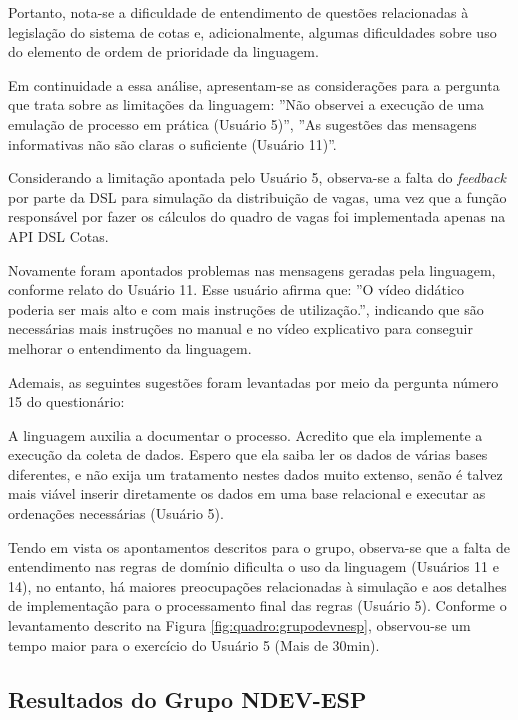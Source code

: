 Portanto, nota-se a dificuldade de entendimento de questões relacionadas à legislação do sistema de cotas e, adicionalmente, algumas dificuldades sobre uso do elemento de ordem de prioridade da linguagem. 

Em continuidade a essa análise, apresentam-se as considerações para a pergunta que trata sobre as limitações da linguagem: ''Não observei a execução de uma emulação de processo em prática (Usuário 5)'', ''As sugestões das mensagens informativas não são claras o suficiente (Usuário 11)''.

Considerando a limitação apontada pelo Usuário 5, observa-se a falta do \textit{feedback} por parte da DSL para simulação da distribuição de vagas, uma vez que a função responsável por fazer os cálculos do quadro de vagas foi implementada apenas na API DSL Cotas. 

Novamente foram apontados problemas nas mensagens geradas pela linguagem, conforme relato do Usuário 11. Esse usuário afirma que: ''O vídeo didático poderia ser mais alto e com mais instruções de utilização.'', indicando que são necessárias mais instruções no manual e no vídeo explicativo para conseguir melhorar o entendimento da linguagem. 

Ademais, as seguintes sugestões foram levantadas por meio da pergunta número 15 do questionário:

\begin{citacao}
A linguagem auxilia a documentar o processo. Acredito que ela implemente a execução da coleta de dados. Espero que ela saiba ler os dados de várias bases diferentes, e não exija um tratamento nestes dados muito extenso, senão é talvez mais viável inserir diretamente os dados em uma base relacional e executar as ordenações necessárias (Usuário 5).
\end{citacao}

Tendo em vista os apontamentos descritos para o grupo, observa-se que a falta de entendimento nas regras de domínio dificulta o uso da linguagem (Usuários 11 e 14), no entanto, há maiores preocupações relacionadas à simulação e aos detalhes de implementação para o processamento final das regras (Usuário 5). Conforme o levantamento descrito na Figura \ref{fig:quadro:grupodevnesp},  observou-se um tempo maior para o exercício do Usuário 5 (Mais de 30min).






\newpage
\subsection{Resultados do Grupo NDEV-ESP}
\label{subsec:ndevesp}

